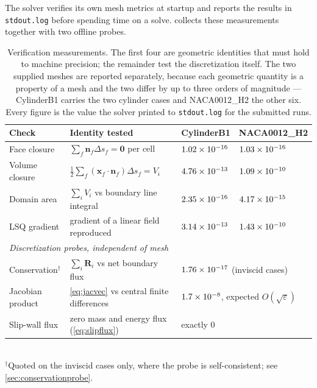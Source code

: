 The solver verifies its own mesh metrics at startup and reports the results in
\texttt{stdout.log} before spending time on a solve.
 collects these measurements together with two offline
probes.

\begin{table}[htbp]
  \centering
  \caption{Verification measurements. The first four are geometric identities that must
  hold to machine precision; the remainder test the discretization itself. The two
  supplied meshes are reported separately, because each geometric quantity is a property
  of a mesh and the two differ by up to three orders of magnitude --- CylinderB1 carries
  the two cylinder cases and NACA0012\_H2 the other six. Every figure is the value the
  solver printed to \texttt{stdout.log} for the submitted runs.}
  \label{tab:verification}
  \small
  \begin{tabular}{llll}
    \toprule
    Check & Identity tested & CylinderB1 & NACA0012\_H2 \\
    \midrule
    Face closure & $\sum_f \mathbf{n}_f\Delta s_f=\mathbf{0}$ per cell
      & $\num{1.02e-16}$ & $\num{1.03e-16}$ \\
    Volume closure & $\tfrac12\sum_f (\mathbf{x}_f\!\cdot\!\mathbf{n}_f)\Delta s_f=V_i$
      & $\num{4.76e-13}$ & $\num{1.09e-10}$ \\
    Domain area & $\sum_i V_i$ vs boundary line integral
      & $\num{2.35e-16}$ & $\num{4.17e-15}$ \\
    LSQ gradient & gradient of a linear field reproduced
      & $\num{3.14e-13}$ & $\num{1.43e-10}$ \\
    \midrule
    \multicolumn{4}{l}{\emph{Discretization probes, independent of mesh}} \\
    Conservation$^\dagger$ & $\sum_i \mathbf{R}_i$ vs net boundary flux
      & \multicolumn{2}{l}{$\num{1.76e-17}$ (inviscid cases)} \\
    Jacobian product & \cref{eq:jacvec} vs central finite differences
      & \multicolumn{2}{l}{$1.7\times10^{-8}$, expected $O(\sqrt{\varepsilon})$} \\
    Slip-wall flux & zero mass and energy flux (\cref{eq:slipflux})
      & \multicolumn{2}{l}{exactly $0$} \\
    \bottomrule
  \end{tabular}
  \\[2pt]
  \footnotesize $^\dagger$Quoted on the inviscid cases only, where the probe is
  self-consistent; see \cref{sec:conservationprobe}.
\end{table}

